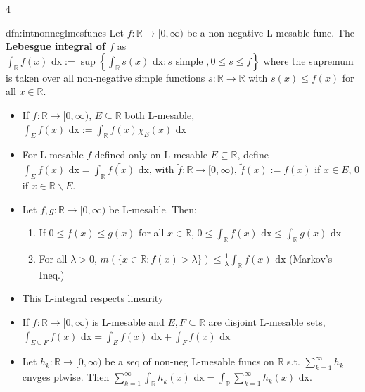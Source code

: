 \documentclass[landscape, 8pt]{extarticle}
\begin{document}
\begin{multicols*}{4}
		
		\begin{dfn-s}{dfn:intnonneglmesfuncs}{ }
			Let $f: \mathbb{R} \to [0, \infty)$ be a non-negative L-mesable func. The \textbf{Lebesgue integral of $f$} as $\int_{\mathbb{R}}f(x) \text{ dx} := \sup\left\{\int_{\mathbb{R}}s(x) \text{ dx} : s \text{ simple }, 0 \le s \le f\right\}$ where the supremum is taken over all non-negative simple functions $s: \mathbb{R} \to \mathbb{R}$ with $s(x) \le f(x)$ for all $x\in \mathbb{R}$.
			\begin{itemize}
				\item If $f: \mathbb{R} \to [0, \infty)$, $E \subseteq \mathbb{R}$ both L-mesable, $\int_E f(x) \text{ dx} := \int_{\mathbb{R}} f(x) \chi_E(x) \text{ dx}$
				\item For L-mesable $f$ defined only on L-mesable $E \subseteq \mathbb{R}$, define $\int_E f(x) \text{ dx} = \int_{\mathbb{R}}\tilde{f(x)} \text{ dx}$, with $\tilde{f}: \mathbb{R}\to [0,\infty)$, $\tilde{f}(x) := f(x)$ if $x\in E$, $0$ if $x\in \mathbb{R} \backslash E$.
				\item Let $f, g : \mathbb{R} \to [0, \infty)$ be L-mesable. Then:
					\begin{enumerate}[label=(\arabic*)]
						\item If $0 \le f(x) \le g(x)$ for all $x\in \mathbb{R}$, $0 \le \int_{\mathbb{R}}f(x) \text{ dx} \le \int_{\mathbb{R}}g(x) \text{ dx}$
						\item For all $\lambda > 0$, $m\left(\{x\in \mathbb{R} : f(x) > \lambda\}\right) \le \frac{1}{\lambda} \int_{\mathbb{R}}f(x) \text{ dx}$ (Markov's Ineq.)
					\end{enumerate} 
				\item This L-integral respects linearity
				\item If $f: \mathbb{R} \to [0, \infty)$ is L-mesable and $E, F \subseteq \mathbb{R}$ are disjoint L-mesable sets, $\int_{E \cup F} f(x) \text{ dx} = \int_E f(x) \text{ dx} + \int_F f(x) \text{ dx}$
				\item Let $h_k : \mathbb{R} \to [0, \infty)$ be a seq of non-neg L-mesable funcs on $\mathbb{R}$ s.t. $\sum_{k=1}^{\infty}h_k$ cnvges ptwise. Then $\sum_{k=1}^{\infty} \int_{\mathbb{R}}h_k(x) \text{ dx} = \int_{\mathbb{R}}\sum_{k=1}^{\infty}h_k(x) \text{ dx}$.
			\end{itemize}
			
		\end{dfn-s}
		

\end{multicols*}
\end{document}
